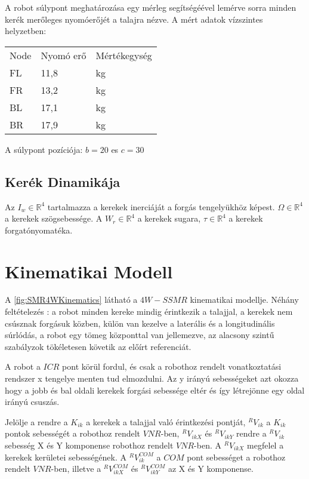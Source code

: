 A robot súlypont meghatározása egy mérleg segítségéével lemérve sorra minden kerék merőleges nyomóerőjét a talajra nézve. 
A mért adatok vízszintes helyzetben:

\begin{table}[H]
\center
\begin{tabular}{lll}
Node  & Nyomó erő & Mértékegység \\
FL &   11,8      & kg          \\
FR &   13,2      & kg          \\
BL &   17,1      & kg          \\
BR &   17,9      & kg            
\end{tabular}
\end{table}

A súlypont pozíciója: $b = 20$ es $c = 30 $

\subsection{Kerék Dinamikája}
Az $I_w \in \mathbb{R}^4$ tartalmazza a kerekek inerciáját a forgás tengelyükhöz képest. $\Omega \in \mathbb{R}^4$ a kerekek szögsebessége. A $W_r \in \mathbb{R}^4$ a kerekek sugara, $\tau \in \mathbb{R}^4$ a kerekek forgatónyomatéka.




\section{Kinematikai Modell} 

A \ref{fig:SMR4WKinematics} látható a $4W-SSMR$ kinematikai modellje. Néhány feltételezés : a robot minden kereke mindig érintkezik a talajjal, a kerekek nem csúsznak forgásuk közben, külön van kezelve a laterális és a longitudinális súrlódás, a robot egy tömeg központtal van jellemezve, az alacsony szintű szabályzok tökéletesen követik az előírt referenciát.

A robot a $ICR$ pont körül fordul, és csak a robothoz rendelt vonatkoztatási rendszer x tengelye menten tud elmozdulni. Az y irányú sebességeket azt okozza hogy a jobb és bal oldali kerekek forgási sebessége eltér és így létrejönne egy oldal irányú csuszás. 

Jelölje a rendre a $K_{ik}$ a kerekek a talajjal való érintkezési pontját, $^RV_{ik}$ a $K_{ik}$ pontok sebességét a robothoz rendelt $VNR$-ben, $^RV_{ikX}$ és $^RV_{ikY}$ rendre a $^RV_{ik}$ sebesség X és Y komponense robothoz rendelt $VNR$-ben. A $^RV_{ikX}$ megfelel a kerekek kerületei sebességének. A $^RV^{COM}_{ik}$ a $COM$ pont sebességet a robothoz rendelt $VNR$-ben, illetve a $^RV^{COM}_{ikX}$ és $^RV^{COM}_{ikY}$ az X és Y komponense. 

